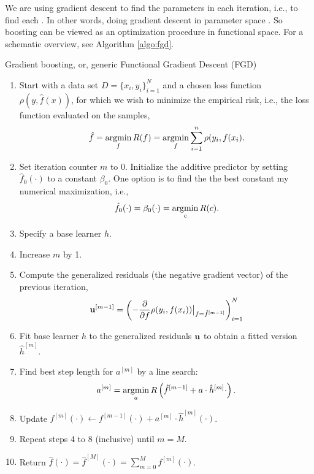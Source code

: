 We are using gradient descent to find the parameters in each iteration, i.e., to find each . In other words, doing gradient descent in parameter space . So boosting can be viewed as an optimization procedure in functional space. For a schematic overview, see Algorithm \ref{algo:fgd}.
\begin{algorithm}
\caption{Gradient boosting, or, generic Functional Gradient Descent (FGD)}
\label{algo:fgd}
\begin{enumerate}
    \item Start with a data set $D=\{x_i, y_i\}_{i=1}^N$ and a chosen loss function $\rho(y,\hat{f}(x))$, for which we wish to
        minimize the empirical risk, i.e., the loss function evaluated on the samples,
        \begin{equation}
            \hat{f}=\operatorname*{argmin}_{f}R(f)=\operatorname*{argmin}_{f}\sum_{i=1}^n\rho(y_{i},f(x_{i}).
        \end{equation}
    \item Set iteration counter $m$ to 0. Initialize the additive predictor by setting $\hat{f}_0(\cdot)$ to a constant $\beta_0$. One option is to find the the best constant my numerical maximization, i.e.,
        \begin{equation}
            \hat{f}_0(\cdot)=\beta_0(\cdot)=\operatorname*{argmin}_c R(c).
        \end{equation}
    \item Specify a base learner $h$.
    \item Increase $m$ by 1.
    \item Compute the generalized residuals (the negative gradient vector) of the previous iteration,
        \begin{equation}
            \mathbf{u}^{[m-1]}=\left(-\frac{\partial}{\partial f}\rho(y_i, f(x_i))\big\rvert_{f=\hat{f}^{[m-1]}}\right)_{i=1}^N
        \end{equation}
    \item Fit base learner $h$ to the generalized residuals $\mathbf{u}$ to obtain a fitted version $\hat{h}^{[m]}$.
    \item Find best step length for $a^{[m]}$ by a line search:
        \begin{equation*}
            a^{[m]}=\operatorname*{argmin}_{a}R\left(\hat{f}^{[m-1]}+a\cdot\hat{h}^{[m]}{\cdot}\right).
        \end{equation*}
    \item Update $f^{[m]}(\cdot)\gets f^{[m-1]}(\cdot)+a^{[m]}\cdot \hat{h}^{[m]}(\cdot)$.
    \item Repeat steps 4 to 8 (inclusive) until $m=M$.
    \item Return $\hat{f}(\cdot)=\hat{f}^{[M]}(\cdot)=\sum_{m=0}^{M}f^{[m]}(\cdot)$.
\end{enumerate}
\end{algorithm}

